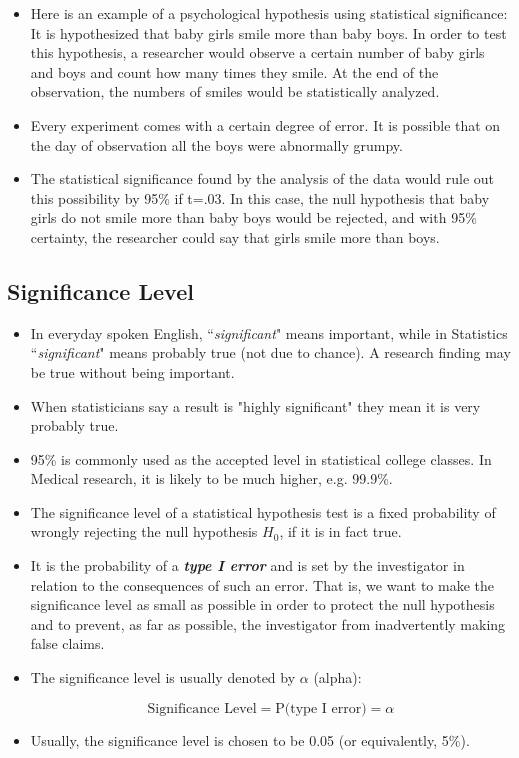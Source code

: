 \begin{itemize}
\item Here is an example of a psychological hypothesis using statistical significance: It is hypothesized that baby girls smile more than baby boys. In order to test this hypothesis, a researcher would observe a certain number of baby girls and boys and count how many times they smile. At the end of the observation, the numbers of smiles would be statistically analyzed.
\item Every experiment comes with a certain degree of error. It is possible that on the day of observation all the boys were abnormally grumpy. 

\item The statistical significance found by the analysis of the data would rule out this possibility by 95\% if t=.03. In this case, the null hypothesis that baby girls do not smile more than baby boys would be rejected, and with 95\% certainty, the researcher could say that girls smile more than boys.

\end{itemize}

\subsection{Significance Level}

\begin{itemize}
\item In everyday spoken English, ``\textit{significant}" means important, while in Statistics ``\textit{significant}" means probably true (not due to chance). A research finding may be true without being important.\item When statisticians say a result is "highly significant" they mean it is very probably true. 

\item 95\% is commonly used as the accepted level in statistical college classes. In Medical research, it is likely to be much higher, e.g. 99.9\%.

\item
The significance level of a statistical hypothesis test is a fixed probability of wrongly rejecting the null hypothesis $H_0$, if it is in fact true.

\item It is the probability of a \textit{\textbf{type I error}} and is set by the investigator in relation to the consequences of such an error. That is, we want to make the significance level as small as possible in order to protect the null hypothesis and to prevent, as far as possible, the investigator from inadvertently making false claims.

\item The significance level is usually denoted by $\alpha$ (alpha):

\[\mbox{Significance Level} = \mbox{P(type I error)} = \alpha\]

\item Usually, the significance level is chosen to be 0.05 (or equivalently, 5\%).

\end{itemize}



